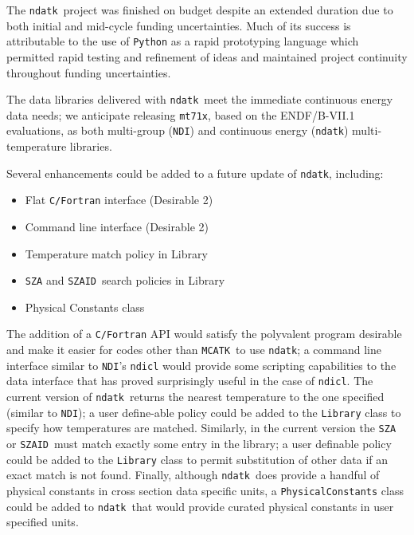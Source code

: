 \documentclass[12pt]{lamemo}
\newcommand{\ndatk}{\texttt{ndatk}}
\newcommand{\MCATK}{\texttt{MCATK}}
\newcommand{\NDI}{\texttt{NDI}}
\newcommand{\zaid}{\texttt{SZAID}}
\begin{document}
The \ndatk\ project was finished on budget despite an extended
duration due to both initial and mid-cycle funding uncertainties.
Much of its success is attributable to the use of \texttt{Python} as a
rapid prototyping language which permitted rapid testing and refinement of
ideas and maintained project continuity throughout funding uncertainties.

The data libraries delivered with \ndatk\ meet the immediate
continuous energy data needs\cite{lee13}; we anticipate releasing
\texttt{mt71x}, based on the ENDF/B-VII.1 evaluations, as both
multi-group (\NDI) and continuous energy (\ndatk) multi-temperature
libraries.

Several enhancements could be added to a future update of \ndatk,
including: 
\begin{itemize}
\item Flat \texttt{C/Fortran} interface (Desirable 2)
\item Command line interface (Desirable 2)
\item Temperature match policy in Library
\item \texttt{SZA} and \zaid\ search policies in Library
\item Physical Constants class
\end{itemize}
The addition of a \texttt{C/Fortran} API would satisfy the polyvalent
program desirable and make it easier for codes other than \MCATK\ to
use \ndatk; a command line interface similar to \NDI's
\texttt{ndicl} would provide some scripting capabilities to the data
interface that has proved surprisingly useful in the case of
\texttt{ndicl}.  The current version of \ndatk\ returns the nearest
temperature to the one specified (similar to \NDI); a user define-able
policy could be added to the \texttt{Library} class to specify how
temperatures are matched.  Similarly, in the current version the
\texttt{SZA} or \zaid\ must match exactly some entry in the library; a
user definable policy could be added to the \texttt{Library} class to
permit substitution of other data if an exact match is not found.
Finally, although \ndatk\ does provide a handful of physical constants
in cross section data specific units, a \texttt{PhysicalConstants}
class could be added to \ndatk\ that would provide curated physical
constants in user specified units.
\end{document}
